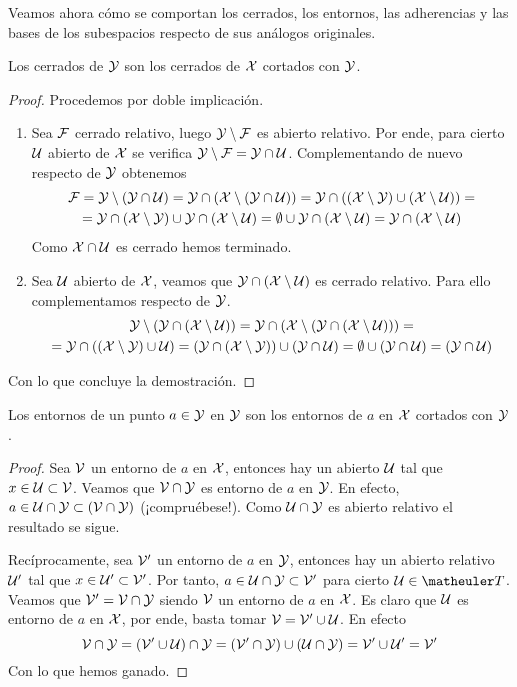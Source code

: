 Veamos ahora cómo se comportan los cerrados, los entornos, las adherencias y las bases de los subespacios respecto de sus análogos originales.
\begin{lem}
	Los cerrados de $\mathcal{Y}$ son los cerrados de $\mathcal{X}$ cortados con $\mathcal{Y}$.
	
	\begin{proof} Procedemos por doble implicación.
		\begin{enumerate}
			\item[\bra] Sea $\mathcal{F}$ cerrado relativo, luego $\mathcal{Y}\setminus \mathcal{F}$ es abierto relativo. Por ende, para cierto $\mathcal{U}$ abierto de $\mathcal{X}$ se verifica $\mathcal{Y}\setminus \mathcal{F}=\mathcal{Y}\cap\mathcal{U}$. Complementando de nuevo respecto de $\mathcal{Y}$ obtenemos
			\begin{multline*}
				\mathcal{F} = \mathcal{Y}\setminus(\mathcal{Y}\cap\mathcal{U})=\mathcal{Y}\cap(\mathcal{X}\setminus(\mathcal{Y}\cap\mathcal{U}))=\mathcal{Y}\cap((\mathcal{X}\setminus\mathcal{Y})\cup(\mathcal{X}\setminus\mathcal{U}))=\\
				=\mathcal{Y}\cap(\mathcal{X}\setminus\mathcal{Y})\cup\mathcal{Y}\cap(\mathcal{X}\setminus\mathcal{U})=\emptyset\cup\mathcal{Y}\cap(\mathcal{X}\setminus\mathcal{U})=\mathcal{Y}\cap(\mathcal{X}\setminus\mathcal{U})
			\end{multline*}
			Como $\mathcal{X}\cap\mathcal{U}$ es cerrado hemos terminado.
			\item[\bla] Sea $\mathcal{U}$ abierto de $\mathcal{X}$, veamos que $\mathcal{Y}\cap(\mathcal{X} \setminus\mathcal{U})$ es cerrado relativo. Para ello complementamos respecto de $\mathcal{Y}$.
			\begin{multline*}
				\mathcal{Y}\setminus(\mathcal{Y}\cap(\mathcal{X} \setminus\mathcal{U}))=\mathcal{Y}\cap(\mathcal{X} \setminus (\mathcal{Y}\cap(\mathcal{X} \setminus \mathcal{U})))=\\
				=\mathcal{Y}\cap((\mathcal{X}\setminus\mathcal{Y})\cup\mathcal{U})=(\mathcal{Y}\cap(\mathcal{X}\setminus\mathcal{Y}))\cup(\mathcal{Y}\cap\mathcal{U})=\emptyset\cup(\mathcal{Y}\cap\mathcal{U})=(\mathcal{Y}\cap\mathcal{U})
			\end{multline*}
		\end{enumerate}
		Con lo que concluye la demostración.
	\end{proof}
\end{lem}
\begin{lem}
	Los entornos de un punto $a \in \mathcal{Y}$ en $\mathcal{Y}$ son los entornos de $a$ en $\mathcal{X}$ cortados con $\mathcal{Y}$.	
\end{lem}
\begin{proof}
	Sea $\mathcal{V}$ un entorno de $a$ en $\mathcal{X}$, entonces hay un abierto $\mathcal{U}$ tal que $x \in \mathcal{U} \subset \mathcal{V}$. Veamos que $\mathcal{V} \cap \mathcal{Y}$ es entorno de $a$ en $\mathcal{Y}$. En efecto, $a \in \mathcal{U} \cap \mathcal{Y}\subset (\mathcal{V} \cap \mathcal{Y})$ (¡compruébese!). Como $\mathcal{U}\cap\mathcal{Y}$ es abierto relativo el resultado se sigue.
	
	Recíprocamente, sea $\mathcal{V}'$ un entorno de $a$ en $\mathcal{Y}$, entonces hay un abierto relativo $\mathcal{U}'$ tal que $x \in \mathcal{U}' \subset \mathcal{V}'$. Por tanto, $a \in \mathcal{U} \cap \mathcal{Y} \subset \mathcal{V}'$ para cierto $\U\in\T$. Veamos que $\mathcal{V}' = \mathcal{V} \cap \mathcal{Y}$ siendo $\mathcal{V}$ un entorno de $a$ en $\mathcal{X}$. Es claro que $\mathcal{U}$ es entorno de $a$ en $\mathcal{X}$, por ende, basta tomar $\mathcal{V} = \mathcal{V}' \cup \mathcal{U}$. En efecto
	\begin{equation*}
		\mathcal{V}\cap\mathcal{Y}=(\mathcal{V}'\cup\mathcal{U})\cap\mathcal{Y}=(\mathcal{V}'\cap\mathcal{Y})\cup(\mathcal{U}\cap\mathcal{Y})=\mathcal{V}'\cup\mathcal{U}'=\mathcal{V}'
	\end{equation*}
	Con lo que hemos ganado.
\end{proof}
